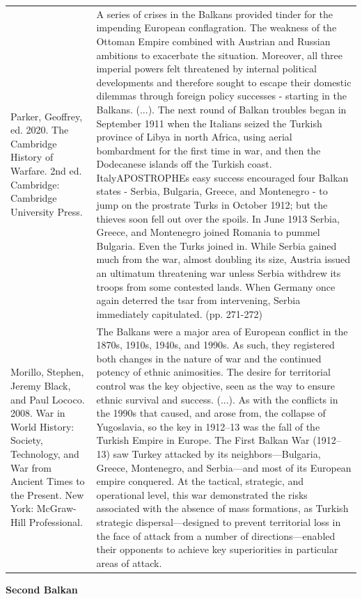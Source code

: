 {\begin{longtable}{p{}p{}}
\\
Parker, Geoffrey, ed. 2020. The Cambridge History of Warfare. 2nd ed. Cambridge: Cambridge University Press. & A series of crises in the Balkans provided tinder for the impending European conflagration. The weakness of the Ottoman Empire combined with Austrian and Russian ambitions to exacerbate the situation. Moreover, all three imperial powers felt threatened by internal political developments and therefore sought to escape their domestic dilemmas through foreign policy successes - starting in the Balkans. (...). 
The next round of Balkan troubles began in September 1911 when the Italians seized the Turkish province of Libya in north Africa, using aerial bombardment for the first time in war, and then the Dodecanese islands off the Turkish coast. ItalyAPOSTROPHEs easy success encouraged four Balkan states - Serbia, Bulgaria, Greece, and Montenegro - to jump on the prostrate Turks in October 1912; but the thieves soon fell out over the spoils. In June 1913 Serbia, Greece, and Montenegro joined Romania to pummel Bulgaria. Even the Turks joined in. While Serbia gained much from the war, almost doubling its size, Austria issued an ultimatum threatening war unless Serbia withdrew its troops from some contested lands. When Germany once again deterred the tsar from intervening, Serbia immediately capitulated. (pp. 271-272)
\\
Morillo, Stephen, Jeremy Black, and Paul Lococo. 2008. War in World History: Society, Technology, and War from Ancient Times to the Present. New York: McGraw-Hill Professional. & The Balkans were a major area of European conflict in the 1870s, 1910s, 1940s, and 1990s. As
such, they registered both changes in the nature of war and the continued potency of ethnic animosities. The desire for territorial control was the key objective, seen as the way to ensure ethnic survival and success. (...). As with the conflicts in the 1990s that caused, and arose from, the collapse of Yugoslavia, so the key in 1912–13 was the fall of the Turkish Empire in Europe. The First Balkan War (1912–13) saw Turkey attacked by its neighbors—Bulgaria, Greece, Montenegro, and Serbia—and most of its European empire conquered. At the tactical, strategic, and operational level, this war demonstrated the risks associated with the absence of mass formations, as Turkish strategic dispersal—designed to prevent territorial loss in the face of attack from a number of directions—enabled their opponents to achieve key superiorities in particular areas of attack.
\\
\end{longtable}}
\clearpage
         \textbf{Second Balkan} 

